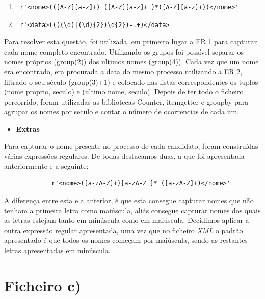 \documentclass[11pt,a4paper]{report}
\begin{document}
	\begin{enumerate}
		\item \begin{verbatim} r'<nome>(([A-Z][a-z]+) ([A-Z][a-z]+ )*([A-Z][a-z]+))</nome>'  \end{verbatim} 
		\item \begin{verbatim} r'<data>((((\d)|(\d){2})\d{2})-.+)</data>  \end{verbatim} 
	\end{enumerate}	
	
	\qquad Para resolver esta questão, foi utilizada, em primeiro lugar a ER 1 para capturar cada nome completo encontrado. Utilizando os grupos foi possível separar os nomes próprios (group(2)) dos ultimos nomes (group(4)). Cada vez que um nome era encontrado, era procurada a data do mesmo processo utilizando a ER 2, filtrado o seu século (group(3)+1) e colocado nas listas correspondentes os tuplos (nome proprio, seculo) e  (ultimo nome, seculo).
Depois de ter todo o ficheiro percorrido, foram utilizadas as bibliotecas Counter, itemgetter e groupby para agrupar os nomes por seculo e contar o número de ocorrencias de cada um.


	\begin{itemize}
		\item \textbf{Extras}
	\end{itemize}

	\qquad Para capturar o nome presente no processo de cada candidato, foram construídas várias expressões regulares. De todas destacamos duas, a que foi apresentada anteriormente e a seguinte:
	   \begin{verbatim}
			 r'<nome>([a-zA-Z]+)[a-zA-Z ]* ([a-zA-Z]+)</nome>'  
	   \end{verbatim} 
	\qquad A diferença entre esta e a anterior, é que esta consegue capturar nomes que não tenham a primeira letra como maiúscula, aliás consegue capturar nomes dos quais as letras estejam tanto em minúscula como em maiúscula. Decidimos aplicar a outra expressão regular apresentada, uma vez que no ficheiro \textit{XML} o padrão apresentado é que todos os nomes começam por maiúscula, sendo as restantes letras apresentadas em minúscula.
	
\vspace{1cm}
	\section*{Ficheiro c)}
\end{document}

